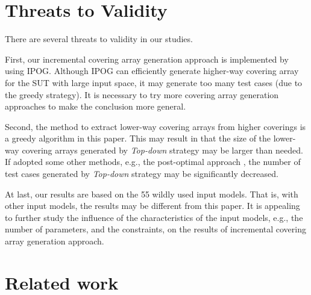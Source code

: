 \documentclass[conference]{IEEEtran}
\theoremstyle{definition}
\begin{document}
\section{Threats to Validity}
There are several threats to validity in our studies.

First, our incremental covering array generation approach is implemented by using IPOG. Although IPOG can efficiently generate higher-way covering array for the SUT with large input space, it may generate too many test cases (due to the greedy strategy). It is necessary to try more covering array generation approaches to make the conclusion more general.

Second, the method to extract lower-way covering arrays from higher coverings is a greedy algorithm in this paper. This may result in that the size of the lower-way covering arrays generated by \emph{Top-down} strategy may be larger than needed. If adopted some other methods, e.g., the post-optimal approach \cite{li2014refining,nayeri2013randomized}, the number of test cases generated by \emph{Top-down} strategy may be significantly decreased.

At last, our results are based on the 55 wildly used input models. That is, with other input models, the results may be different from this paper. It is appealing to further study the influence of the characteristics of the input models, e.g., the number of parameters, and the constraints, on the results of incremental covering array generation approach.

\section{Related work}
\end{document}
